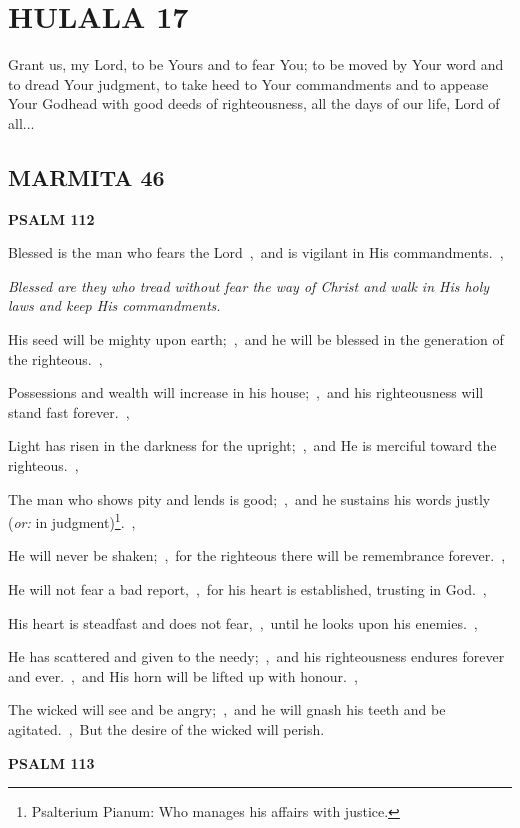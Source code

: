 \documentclass[12pt,twoside,a5paper]{article}
\newcommand{\hulala}[1]{\section*{HULALA {#1}}}
\newcommand{\marmita}[1]{\subsection*{MARMITA {#1}}}
\newcommand{\psalm}[1]{\textbf{PSALM {#1}}\nopagebreak}
\newcommand{\qanona}[1]{{\liturgicalhint{Qanona.} \emph{#1}}}
\newcommand{\slota}[1]{\liturgicalhint{Slota.} #1}
\newcommand{\translationoption}[1]{\emph{or:} #1}
\begin{document}

\hulala{17}

\slota{Grant us, my Lord, to be Yours and to fear You; to be moved by Your word and to dread Your judgment, to take heed to Your commandments and to appease Your Godhead with good deeds of righteousness, all the days of our life, Lord of all...}

\marmita{46}

\psalm{112}

\begin{normalparskip}
  Blessed is the man who fears the Lord~\sep\ and is vigilant in His commandments.~\sep

  \qanona{Blessed are they who tread without fear the way of Christ and walk in His holy laws and keep His commandments.}

  His seed will be mighty upon earth;~\sep\ and he will be blessed in the generation of the righteous.~\sep

  Possessions and wealth will increase in his house;~\sep\ and his righteousness will stand fast forever.~\sep

  Light has risen in the darkness for the upright;~\sep\ and He is merciful toward the righteous.~\sep

  The man who shows pity and lends is good;~\sep\ and he sustains his words justly (\translationoption{in judgment})\footnote{Psalterium Pianum: Who manages his affairs with justice.}.~\sep

  He will never be shaken;~\sep\ for the righteous there will be remembrance forever.~\sep

  He will not fear a bad report,~\sep\ for his heart is established, trusting in God.~\sep

  His heart is steadfast and does not fear,~\sep\ until he looks upon his enemies.~\sep

  He has scattered and given to the needy;~\sep\ and his righteousness endures forever and ever.~\sep\ and His horn will be lifted up with honour.~\sep

  The wicked will see and be angry;~\sep\ and he will gnash his teeth and be agitated.~\sep\ But the desire of the wicked will perish.
\end{normalparskip}

\psalm{113}
\end{document}
